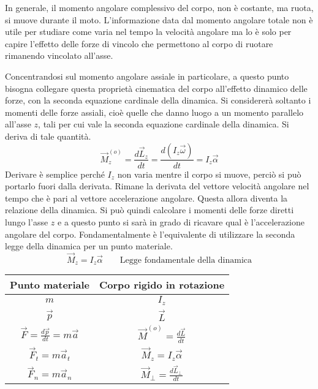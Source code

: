 \documentclass[10pt,a4paper]{book}
\begin{document}
\begin{figure}[htpb]
\end{figure}
\FloatBarrier
In generale, il momento angolare complessivo del corpo, non è costante, ma ruota, si muove durante il moto. L'informazione data dal momento angolare totale non è utile per studiare come varia nel tempo la velocità angolare ma lo è solo per capire l'effetto delle forze di vincolo che permettono al corpo di ruotare rimanendo vincolato all'asse.

Concentrandosi sul momento angolare assiale in particolare, a questo punto bisogna collegare questa proprietà cinematica del corpo all'effetto dinamico delle forze, con la seconda equazione cardinale della dinamica. Si considererà soltanto i momenti delle forze assiali, cioè quelle che danno luogo a un momento parallelo all'asse $z$, tali per cui vale la seconda equazione cardinale della dinamica. Si deriva di tale quantità.
\[
	\vec{M}^{(o)}_z = \frac{d\vec{L}_z }{dt} = \frac{d(I_z\vec{\omega}) }{dt} = I_z \vec{\alpha}
\]
Derivare è semplice perché $I_z$ non varia mentre il corpo si muove, perciò si può portarlo fuori dalla derivata. Rimane la derivata del vettore velocità angolare nel tempo che è pari al vettore accelerazione angolare. Questa allora diventa la relazione della dinamica. Si può quindi calcolare i momenti delle forze diretti lungo l'asse $z$ e a questo punto si sarà in grado di ricavare qual è l'accelerazione angolare del corpo. Fondamentalmente è l'equivalente di utilizzare la seconda legge della dinamica per un punto materiale.
\[
	\boxed{\vec{M}_z = I_z\vec{\alpha}} \qquad \text{Legge fondamentale della dinamica}
\]
\begin{table}[H]
		\centering
		\begin{tabular}{c|c}
			Punto materiale & Corpo rigido in rotazione \\
			\hline
			$m$ & $I_z$ \\
			$\vec{p}$ & $\vec{L}$ \\
			$\vec{F} = \frac{d\vec{p} }{dt} = m\vec{a}$ & $\vec{M}^{(o)} = \frac{d\vec{L} }{dt}$ \\
			$\vec{F}_t = m\vec{a}_t$ & $\vec{M}_z=I_z\vec{\alpha}$ \\
			$\vec{F}_n = m\vec{a}_n$ & $\vec{M}_{\bot} = \frac{d\vec{L}_{\bot} }{dt}$
		\end{tabular}
	\end{table}
\end{document}
